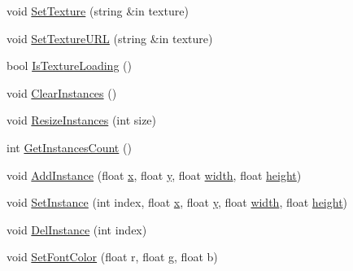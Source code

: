 \begin{DoxyCompactItemize}
\item 
void \hyperlink{class_g_u_i_button_ae1f76581fdab67e52dbecde264b68b4c}{Set\+Texture} (string \&in texture)
\item 
void \hyperlink{class_g_u_i_button_a5fd6a68006195bc100908780dfd54e93}{Set\+Texture\+U\+RL} (string \&in texture)
\item 
bool \hyperlink{class_g_u_i_button_af72bdddbbfb521fdc41ce8afd61795a5}{Is\+Texture\+Loading} ()
\item 
void \hyperlink{class_g_u_i_button_ad0f6147ba79ce14840ed061e25ca7e40}{Clear\+Instances} ()
\item 
void \hyperlink{class_g_u_i_button_acc1ba3e2166e3bf646906b533386262b}{Resize\+Instances} (int size)
\item 
int \hyperlink{class_g_u_i_button_a785c0dcbdfafb4b09efcc679bf7b3ab5}{Get\+Instances\+Count} ()
\item 
void \hyperlink{class_g_u_i_button_a10e7ff6887b7c7b6e40efe3992f5ad9a}{Add\+Instance} (float \hyperlink{class_g_u_i_button_a96c92133496c72d303c85591a654b89b}{x}, float \hyperlink{class_g_u_i_button_a9f4443456836e794a33ff93dea5b37dc}{y}, float \hyperlink{class_g_u_i_button_aa3afa57c02d1b909f3124f0ae35e416d}{width}, float \hyperlink{class_g_u_i_button_a1126a7d91aa88611cc0f3b855343ad1b}{height})
\item 
void \hyperlink{class_g_u_i_button_ac8127b8802acc9f246071366df61f783}{Set\+Instance} (int index, float \hyperlink{class_g_u_i_button_a96c92133496c72d303c85591a654b89b}{x}, float \hyperlink{class_g_u_i_button_a9f4443456836e794a33ff93dea5b37dc}{y}, float \hyperlink{class_g_u_i_button_aa3afa57c02d1b909f3124f0ae35e416d}{width}, float \hyperlink{class_g_u_i_button_a1126a7d91aa88611cc0f3b855343ad1b}{height})
\item 
void \hyperlink{class_g_u_i_button_a8a59c9135d1533ce03f1c56c2240725f}{Del\+Instance} (int index)
\item 
void \hyperlink{class_g_u_i_button_a4fb847cc28ff6386c2272d6b9b7c03d5}{Set\+Font\+Color} (float r, float g, float b)
\end{DoxyCompactItemize}
